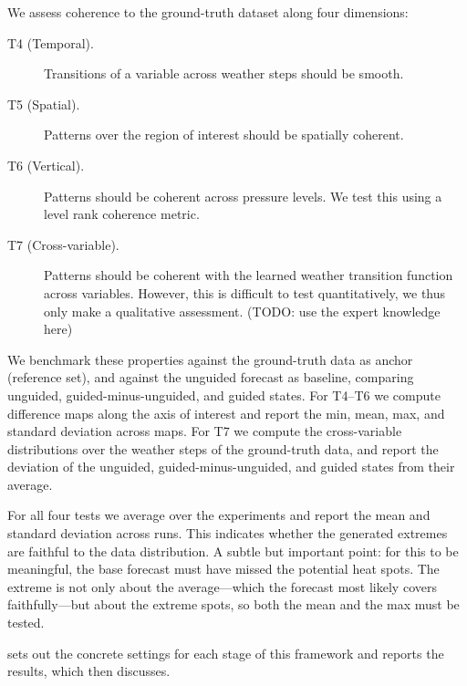 We assess coherence to the ground-truth dataset along four dimensions:

\begin{description}
    \item[T4 (Temporal).] Transitions of a variable across weather steps should be smooth.
    \item[T5 (Spatial).] Patterns over the region of interest should be spatially coherent.
    \item[T6 (Vertical).] Patterns should be coherent across pressure levels. 
    We test this using a level rank coherence metric.
    \item[T7 (Cross-variable).] Patterns should be coherent with the learned weather transition function across variables.
    However, this is difficult to test quantitatively, we thus only make a qualitative assessment. (TODO: use the expert knowledge here)
\end{description}

We benchmark these properties against the ground-truth data as anchor (reference set), and against the unguided forecast as baseline, comparing unguided, guided-minus-unguided, and guided states. For T4--T6 we compute difference maps along the axis of interest and report the min, mean, max, and standard deviation across maps. For T7 we compute the cross-variable distributions over the weather steps of the ground-truth data, and report the deviation of the unguided, guided-minus-unguided, and guided states from their average.

For all four tests we average over the experiments and report the mean and standard deviation across runs. This indicates whether the generated extremes are faithful to the data distribution. A subtle but important point: for this to be meaningful, the base forecast must have missed the potential heat spots. The extreme is not only about the average---which the forecast most likely covers faithfully---but about the extreme spots, so both the mean and the max must be tested.


 sets out the concrete settings for each stage of this framework and reports the results, which  then discusses.

